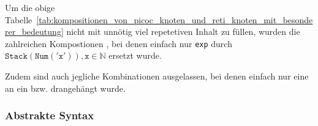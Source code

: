 \begin{Special_Paragraph}
  Um die obige Tabelle~\ref{tab:kompositionen_von_picoc_knoten_und_reti_knoten_mit_besonderer_bedeutung} nicht mit unnötig viel repetetiven Inhalt zu füllen, wurden die zahlreichen Kompostionen , bei denen einfach nur \verb|exp| durch $\mathtt{Stack(Num('x')), x}\in\mathbb{N}$ ersetzt wurde.

  Zudem sind auch jegliche Kombinationen ausgelassen, bei denen einfach nur eine  an ein  bzw.   drangehängt wurde.
\end{Special_Paragraph}

\subsubsection{Abstrakte Syntax}

